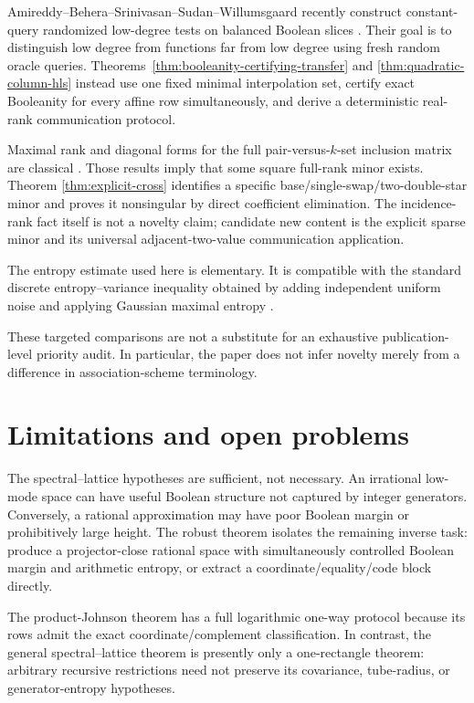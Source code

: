 \documentclass[11pt]{article}
\theoremstyle{definition}
\theoremstyle{remark}
\newcommand{\1}{\mathbf 1}
\begin{document}
Amireddy--Behera--Srinivasan--Sudan--Willumsgaard recently construct
constant-query randomized low-degree tests on balanced Boolean slices
\cite{AmireddyBeheraSrinivasanSudanWillumsgaard}.  Their goal is to
distinguish low degree from functions far from low degree using fresh random
oracle queries.  Theorems~\ref{thm:booleanity-certifying-transfer} and
\ref{thm:quadratic-column-hls} instead use one fixed minimal interpolation
set, certify exact Booleanity for every affine row simultaneously, and derive
a deterministic real-rank communication protocol.

Maximal rank and diagonal forms for the full pair-versus-$k$-set inclusion
matrix are classical \cite{GottliebIncidence,WilsonIncidence}.  Those results
imply that some square full-rank minor exists.  Theorem
\ref{thm:explicit-cross} identifies a specific base/single-swap/two-double-star
minor and proves it nonsingular by direct coefficient elimination.  The
incidence-rank fact itself is not a novelty claim; candidate new content is
the explicit sparse minor and its universal adjacent-two-value communication
application.

The entropy estimate used here is elementary.  It is compatible with the
standard discrete entropy--variance inequality obtained by adding independent
uniform noise and applying Gaussian maximal entropy
\cite{GavalakisKontoyiannis}.

These targeted comparisons are not a substitute for an exhaustive
publication-level priority audit.  In particular, the paper does not infer
novelty merely from a difference in association-scheme terminology.

\section{Limitations and open problems}

The spectral--lattice hypotheses are sufficient, not necessary.  An
irrational low-mode space can have useful Boolean structure not captured by
integer generators.  Conversely, a rational approximation may have poor
Boolean margin or prohibitively large height.  The robust theorem isolates
the remaining inverse task: produce a projector-close rational space with
simultaneously controlled Boolean margin and arithmetic entropy, or extract a
coordinate/equality/code block directly.

The product-Johnson theorem has a full logarithmic one-way protocol because
its rows admit the exact coordinate/complement classification.  In contrast,
the general spectral--lattice theorem is presently only a one-rectangle
theorem: arbitrary recursive restrictions need not preserve its covariance,
tube-radius, or generator-entropy hypotheses.
\end{document}

